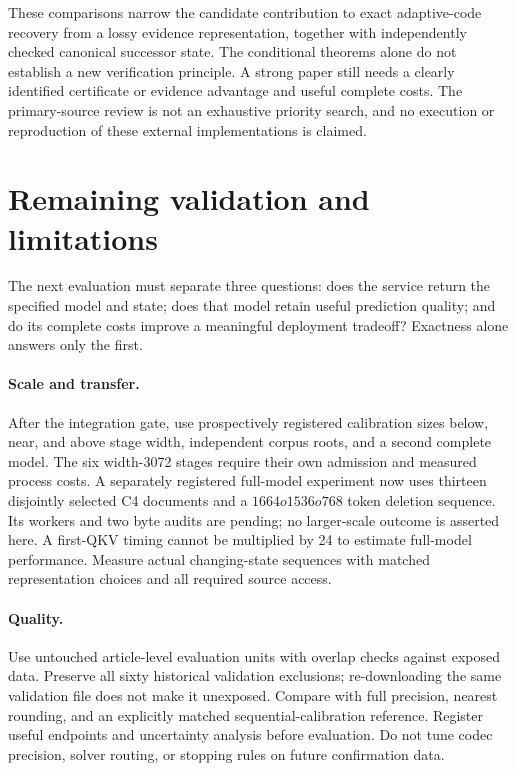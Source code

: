 \documentclass[10pt,twocolumn,letterpaper]{article}
\begin{document}
These comparisons narrow the candidate contribution to exact adaptive-code
recovery from a lossy evidence representation, together with independently
checked canonical successor state. The conditional theorems alone do not
establish a new verification principle. A strong paper still needs a clearly
identified certificate or evidence advantage and useful complete costs. The
primary-source review is not an exhaustive priority search, and no execution or
reproduction of these external implementations is claimed.

\section{Remaining validation and limitations}
The next evaluation must separate three questions: does the service return the
specified model and state; does that model retain useful prediction quality; and
do its complete costs improve a meaningful deployment tradeoff? Exactness alone
answers only the first.

\paragraph{Scale and transfer.}
After the integration gate, use prospectively registered calibration sizes below,
near, and above stage width, independent corpus roots, and a second complete model.
The six width-3072 stages require their own admission and measured process costs.
A separately registered full-model experiment now uses thirteen disjointly
selected C4 documents and a $1664	o1536	o768$ token deletion sequence. Its
workers and two byte audits are pending; no larger-scale outcome is asserted here.
A first-QKV timing cannot be multiplied by 24 to estimate full-model performance.
Measure actual changing-state sequences with matched representation choices and
all required source access.

\paragraph{Quality.}
Use untouched article-level evaluation units with overlap checks against exposed
data. Preserve all sixty historical validation exclusions; re-downloading the
same validation file does not make it unexposed. Compare with full precision,
nearest rounding, and an explicitly matched sequential-calibration reference.
Register useful endpoints and uncertainty analysis before evaluation. Do not tune
codec precision, solver routing, or stopping rules on future confirmation data.
\end{document}
